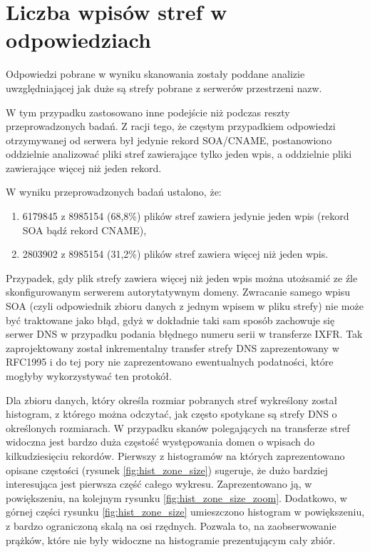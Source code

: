 \section{Liczba wpisów stref w odpowiedziach}
Odpowiedzi pobrane w wyniku skanowania zostały poddane analizie uwzględniającej jak duże są strefy pobrane z serwerów przestrzeni nazw.

W tym przypadku zastosowano inne podejście niż podczas reszty przeprowadzonych badań. Z racji tego, że częstym przypadkiem odpowiedzi
otrzymywanej od serwera był jedynie rekord SOA/CNAME, postanowiono oddzielnie analizować pliki stref zawierające tylko jeden wpis, a
oddzielnie pliki zawierające więcej niż jeden rekord.

W wyniku przeprowadzonych badań ustalono, że:
\begin{enumerate}
	\item 6179845 z 8985154 (68,8\%) plików stref zawiera jedynie jeden wpis (rekord SOA bądź rekord CNAME),
	\item 2803902 z 8985154 (31,2\%) plików stref zawiera więcej niż jeden wpis.
\end{enumerate}
Przypadek, gdy plik strefy zawiera więcej niż jeden wpis można utożsamić ze źle skonfigurowanym serwerem autorytatywnym domeny.
Zwracanie samego wpisu SOA (czyli odpowiednik zbioru danych z jednym wpisem w pliku strefy) nie może być traktowane jako błąd,
gdyż w dokładnie taki sam sposób zachowuje się serwer DNS w przypadku podania błędnego numeru serii w transferze IXFR. Tak
zaprojektowany został inkrementalny transfer strefy DNS zaprezentowany w RFC1995 \cite{RFC1995} i do tej pory nie zaprezentowano
ewentualnych podatności, które mogłyby wykorzystywać ten protokół.

Dla zbioru danych, który określa rozmiar pobranych stref wykreślony został histogram, z którego można odczytać, jak często spotykane
są strefy DNS o określonych rozmiarach. W przypadku skanów polegających na transferze stref widoczna jest bardzo duża częstość
występowania domen o wpisach do kilkudziesięciu rekordów. Pierwszy z histogramów na których zaprezentowano opisane częstości
(rysunek \ref{fig:hist_zone_size}) sugeruje, że dużo bardziej interesująca jest pierwsza część całego wykresu. Zaprezentowano ją,
w powiększeniu, na kolejnym rysunku \ref{fig:hist_zone_size_zoom}. Dodatkowo, w górnej części rysunku \ref{fig:hist_zone_size}
umieszczono histogram w powiększeniu, z bardzo ograniczoną skalą na osi rzędnych. Pozwala to, na zaobserwowanie prążków, które
nie były widoczne na histogramie prezentującym cały zbiór.

